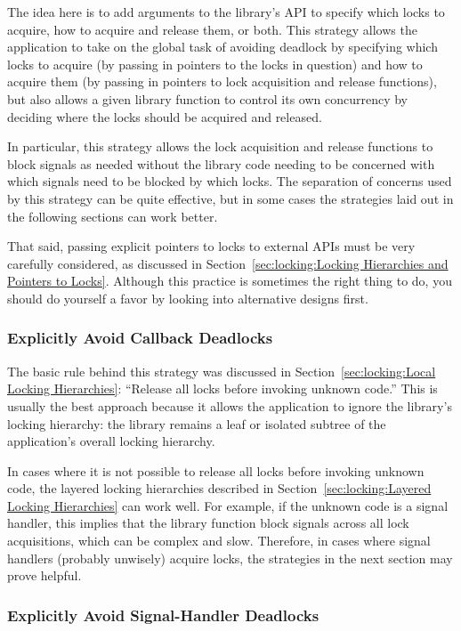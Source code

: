 The idea here is to add arguments to the library's API to specify
which locks to acquire, how to acquire and release them, or both.
This strategy allows the application to take on the global task of
avoiding deadlock by specifying which locks to acquire (by passing in
pointers to the locks in question) and how to
acquire them (by passing in pointers to lock acquisition and release
functions),
but also allows a given library function to control its own concurrency
by deciding where the locks should be acquired and released.

In particular, this strategy allows the lock acquisition and release
functions to block signals as needed without the library code needing to
be concerned with which signals need to be blocked by which locks.
The separation of concerns used by this strategy can be quite effective,
but in some cases the strategies laid out in the following sections
can work better.

That said, passing explicit pointers to locks to external APIs must
be very carefully considered, as discussed in
Section~\ref{sec:locking:Locking Hierarchies and Pointers to Locks}.
Although this practice is sometimes the right thing to do, you should do
yourself a favor by looking into alternative designs first.

\subsubsection{Explicitly Avoid Callback Deadlocks}
\label{sec:locking:Explicitly Avoid Callback Deadlocks}

The basic rule behind this strategy was discussed in
Section~\ref{sec:locking:Local Locking Hierarchies}: ``Release all
locks before invoking unknown code.''
This is usually the best approach because it allows the application to
ignore the library's locking hierarchy: the library remains a leaf or
isolated subtree of the application's overall locking hierarchy.

In cases where it is not possible to release all locks before invoking
unknown code, the layered locking hierarchies described in
Section~\ref{sec:locking:Layered Locking Hierarchies} can work well.
For example, if the unknown code is a signal handler, this implies that
the library function block signals across all lock acquisitions, which
can be complex and slow.
Therefore, in cases where signal handlers (probably unwisely) acquire
locks, the strategies in the next section may prove helpful.

\subsubsection{Explicitly Avoid Signal-Handler Deadlocks}
\label{sec:locking:Explicitly Avoid Signal-Handler Deadlocks}

